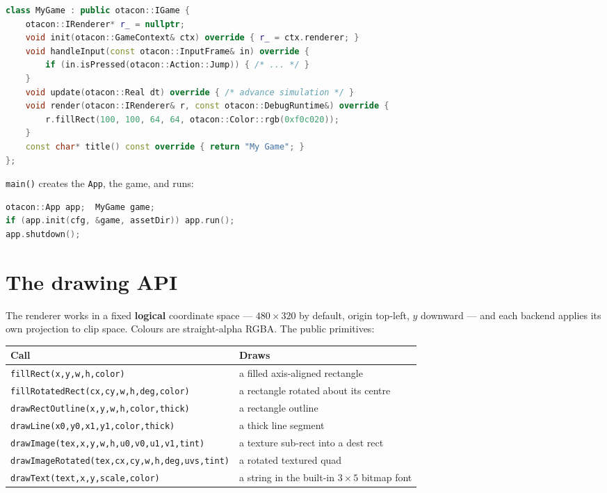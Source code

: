 \documentclass[11pt]{report}
\newcommand{\code}[1]{\texttt{#1}}
\begin{document}
\begin{lstlisting}[language=C++]
class MyGame : public otacon::IGame {
    otacon::IRenderer* r_ = nullptr;
    void init(otacon::GameContext& ctx) override { r_ = ctx.renderer; }
    void handleInput(const otacon::InputFrame& in) override {
        if (in.isPressed(otacon::Action::Jump)) { /* ... */ }
    }
    void update(otacon::Real dt) override { /* advance simulation */ }
    void render(otacon::IRenderer& r, const otacon::DebugRuntime&) override {
        r.fillRect(100, 100, 64, 64, otacon::Color::rgb(0xf0c020));
    }
    const char* title() const override { return "My Game"; }
};
\end{lstlisting}

\code{main()} creates the \code{App}, the game, and runs:
\begin{lstlisting}[language=C++]
otacon::App app;  MyGame game;
if (app.init(cfg, &game, assetDir)) app.run();
app.shutdown();
\end{lstlisting}

\chapter{The drawing API}\label{ch:draw}
The renderer works in a fixed \textbf{logical} coordinate space ---
$480\times320$ by default, origin top-left, $y$ downward --- and each backend
applies its own projection to clip space. Colours are straight-alpha RGBA. The
public primitives:

\begin{longtable}{ll}
\toprule
Call & Draws \\
\midrule
\endhead
\code{fillRect(x,y,w,h,color)} & a filled axis-aligned rectangle \\
\code{fillRotatedRect(cx,cy,w,h,deg,color)} & a rectangle rotated about its centre \\
\code{drawRectOutline(x,y,w,h,color,thick)} & a rectangle outline \\
\code{drawLine(x0,y0,x1,y1,color,thick)} & a thick line segment \\
\code{drawImage(tex,x,y,w,h,u0,v0,u1,v1,tint)} & a texture sub-rect into a dest rect \\
\code{drawImageRotated(tex,cx,cy,w,h,deg,uvs,tint)} & a rotated textured quad \\
\code{drawText(text,x,y,scale,color)} & a string in the built-in $3\times5$ bitmap font \\
\bottomrule
\end{longtable}
\end{document}
